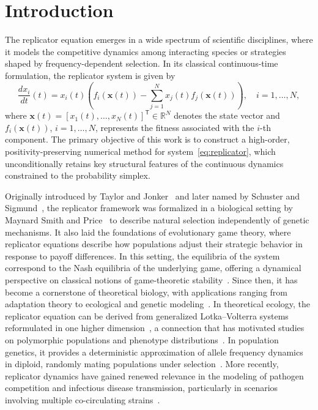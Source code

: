 \documentclass[11pt,letterpaper]{article}
\theoremstyle{remark}
\begin{document}
\section{Introduction}
The replicator equation emerges in a wide spectrum of scientific disciplines, where it models the competitive dynamics among interacting species or strategies shaped by frequency-dependent selection. In its classical continuous-time formulation, the replicator system is given by
\begin{equation}\label{eq:replicator}
  \frac{dx_i}{dt}(t) = x_i(t)\left( f_i(\bm{x}(t)) - \sum_{j=1}^{N} x_j(t) f_j(\bm{x}(t)) \right),\quad i=1,\dots,N,
\end{equation}
where $\bm{x}(t)=[x_1(t),\dots,x_N(t)]^\mathsf{T}\in \mathbb{R}^N$ denotes the state vector and $f_i(\bm{x}(t))$, $i=1,\dots,N$, represents the fitness associated with the $i$-th component. The primary objective of this work is to construct a high-order, positivity-preserving numerical method for system~\eqref{eq:replicator}, which unconditionally retains key structural features of the continuous dynamics constrained to the probability simplex.

Originally introduced by Taylor and Jonker~\cite{Taylor1978} and later named by Schuster and Sigmund~\cite{SCHUSTER}, the replicator framework was formalized in a biological setting by Maynard Smith and Price~\cite{SMITH_1973,MAYNARDSMITH1974209} to describe natural selection independently of genetic mechanisms. It also laid the foundations of evolutionary game theory, where replicator equations describe how populations adjust their strategic behavior in response to payoff differences. In this setting, the equilibria of the system correspond to the Nash equilibria of the underlying game, offering a dynamical perspective on classical notions of game-theoretic stability~\cite{Sandholm2010,Random,Natalini1,Natalini2}.
Since then, it has become a cornerstone of theoretical biology, with applications ranging from adaptation theory to ecological and genetic modeling~\cite{Hofbauer1998,Nowak2006}. In theoretical ecology, the replicator equation can be derived from generalized Lotka–Volterra systems reformulated in one higher dimension~\cite{Hofbauer1998,Hofbauer_2003}, a connection that has motivated studies on polymorphic populations and phenotype distributions~\cite{Varga_2024}. In population genetics, it provides a deterministic approximation of allele frequency dynamics in diploid, randomly mating populations under selection~\cite{Hofbauer_2003,Ewens_2004}. More recently, replicator dynamics have gained renewed relevance in the modeling of pathogen competition and infectious disease transmission, particularly in scenarios involving multiple co-circulating strains~\cite{Gjini_2023,Madec_2020}.
\end{document}
